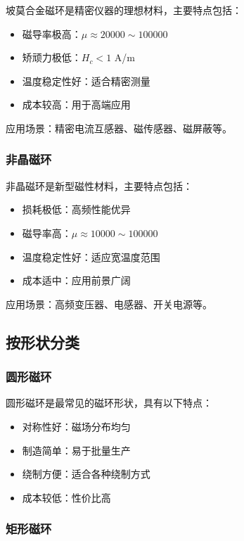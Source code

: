 \documentclass[12pt,UTF8]{ctexbook}
\begin{document}
坡莫合金磁环是精密仪器的理想材料，主要特点包括：

\begin{itemize}[leftmargin=2cm]
    \item 磁导率极高：$\mu \approx 20000 \sim 100000$
    \item 矫顽力极低：$H_c < 1$ A/m
    \item 温度稳定性好：适合精密测量
    \item 成本较高：用于高端应用
\end{itemize}

应用场景：精密电流互感器、磁传感器、磁屏蔽等。

\subsubsection{非晶磁环}

非晶磁环是新型磁性材料，主要特点包括：

\begin{itemize}[leftmargin=2cm]
    \item 损耗极低：高频性能优异
    \item 磁导率高：$\mu \approx 10000 \sim 100000$
    \item 温度稳定性好：适应宽温度范围
    \item 成本适中：应用前景广阔
\end{itemize}

应用场景：高频变压器、电感器、开关电源等。

\subsection{按形状分类}

\subsubsection{圆形磁环}

圆形磁环是最常见的磁环形状，具有以下特点：

\begin{itemize}[leftmargin=2cm]
    \item 对称性好：磁场分布均匀
    \item 制造简单：易于批量生产
    \item 绕制方便：适合各种绕制方式
    \item 成本较低：性价比高
\end{itemize}

\subsubsection{矩形磁环}
\end{document}
